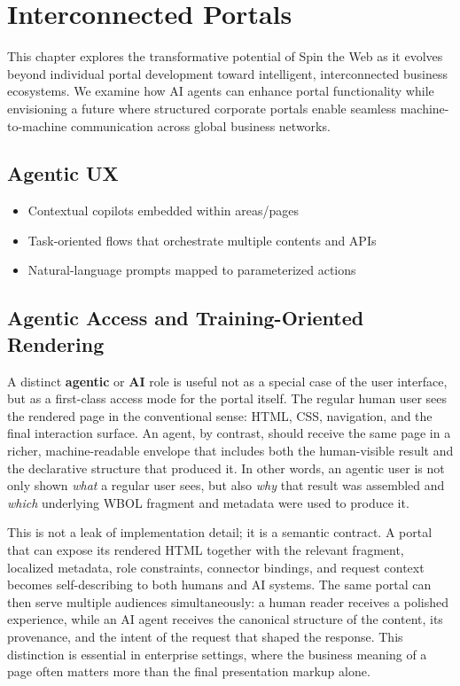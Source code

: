 
\chapter{Interconnected Portals}
\label{chap:interconnected-portals}

This chapter explores the transformative potential of Spin the Web as it evolves beyond individual portal development toward intelligent, interconnected business ecosystems. We examine how AI agents can enhance portal functionality while envisioning a future where structured corporate portals enable seamless machine-to-machine communication across global business networks.

\section{Agentic UX}
\begin{itemize}
	\item Contextual copilots embedded within areas/pages
	\item Task-oriented flows that orchestrate multiple contents and APIs
	\item Natural-language prompts mapped to parameterized actions
\end{itemize}

\section{Agentic Access and Training-Oriented Rendering}
\label{sec:agentic-access}

A distinct \textbf{agentic} or \textbf{AI} role is useful not as a special case of the user interface, but as a first-class access mode for the portal itself. The regular human user sees the rendered page in the conventional sense: HTML, CSS, navigation, and the final interaction surface. An agent, by contrast, should receive the same page in a richer, machine-readable envelope that includes both the human-visible result and the declarative structure that produced it. In other words, an agentic user is not only shown \emph{what} a regular user sees, but also \emph{why} that result was assembled and \emph{which} underlying WBOL fragment and metadata were used to produce it.

This is not a leak of implementation detail; it is a semantic contract. A portal that can expose its rendered HTML together with the relevant \wbol{} fragment, localized metadata, role constraints, connector bindings, and request context becomes self-describing to both humans and AI systems. The same portal can then serve multiple audiences simultaneously: a human reader receives a polished experience, while an AI agent receives the canonical structure of the content, its provenance, and the intent of the request that shaped the response. This distinction is essential in enterprise settings, where the business meaning of a page often matters more than the final presentation markup alone.

